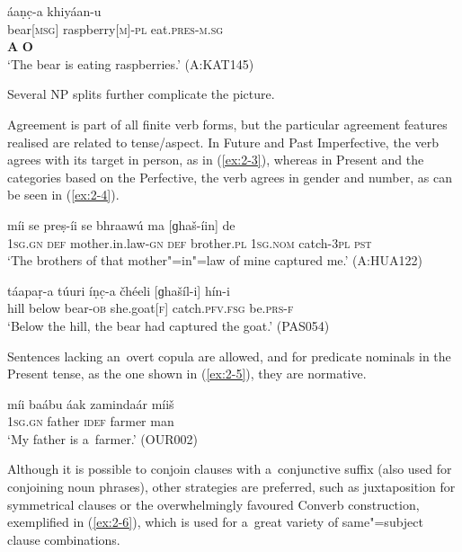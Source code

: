 \begin{exe}
\ex
\label{ex:2-2}
\glll [iṇc̣] áaṇc̣-a khiyáan-u\\
bear[\textsc{msg}] raspberry[\textsc{m}]-\textsc{pl} eat.\textsc{pres-m.sg} \\
\textbf{A} \textbf{O} \\
\glt `The bear is eating raspberries.' (A:KAT145)
\end{exe} 
Several NP splits further complicate the picture.


Agreement is part of all finite verb forms, but the particular agreement features realised are related to tense/aspect. In Future and Past Imperfective, the verb agrees with its target in person, as in (\ref{ex:2-3}), whereas in Present and the categories based on the Perfective, the verb agrees in gender and number, as can be seen in (\ref{ex:2-4}).

\begin{exe}
\ex
\label{ex:2-3}
\gll míi se preṣ-íi se bhraawú ma [ɡhaš-íin] de \\
\textsc{1sg.gn} \textsc{def} mother.in.law-\textsc{gn} \textsc{def} brother.\textsc{pl} \textsc{1sg.nom} catch-\textsc{3pl} \textsc{pst} \\
\glt `The brothers of that mother"=in"=law of mine captured me.' (A:HUA122)
\end{exe}

\begin{exe}
\ex
\label{ex:2-4}
\gll táapaṛ-a túuri íṇc̣-a čhéeli [ɡhašíl-i] hín-i \\ 
hill below bear-\textsc{ob} she.goat[\textsc{f}] catch.\textsc{pfv.fsg} be.\textsc{prs-f} \\
\glt `Below the hill, the bear had captured the goat.' (PAS054)
\end{exe}

Sentences lacking an~overt copula are allowed, and for predicate nominals in the Present tense, as the one shown in (\ref{ex:2-5}), they are normative.

\begin{exe}
\ex
\label{ex:2-5}
\gll míi baábu áak zamindaár míiš \\ 
\textsc{1sg.gn} father \textsc{idef} farmer man \\
\glt `My father is a~farmer.' (OUR002)
\end{exe}
Although it is possible to conjoin clauses with a~conjunctive suffix (also used for conjoining noun phrases), other strategies are preferred, such as juxtaposition for symmetrical clauses or the overwhelmingly favoured Converb construction, exemplified in (\ref{ex:2-6}), which is used for a~great variety of same"=subject clause combinations.

